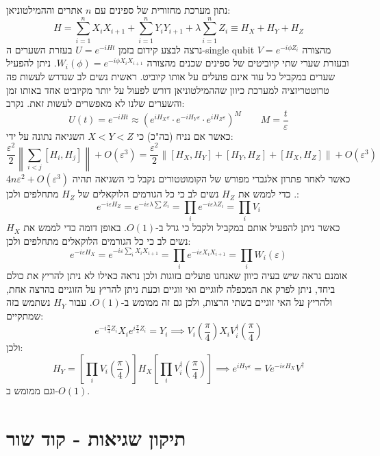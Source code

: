 \documentclass{tstextbook}
\begin{document}
\begin{example}
נתון מערכת מחזורית של ספינים עם \(n\) אתרים וההמילטוניאן:
$$H=\sum_{i=1}^{n}X_{i}X_{i+1}+\sum_{i=1}^{n}Y_{i}Y_{i+1}+\lambda\sum_{i=1}^{n}Z_{i}\equiv H_{X}+H_{Y}+H_{Z}$$
נרצה לבצע קידום בזמן \(U=e^{ -iHt }\) בעזרת השערים ה-single qubit מהצורה \(V=e^{ -i\phi Z_{i} }\) ובעזרת שערי שתי קיוביטים של ספינים שכנים מהצורה \(W_{i}\left( \phi \right)=e^{ -i\phi X_{i}X_{i+1} }\). ניתן להפעיל שערים במקביל כל עוד אינם פועלים על אותו קיוביט. ראשית נשים לב שנדרש לעשות פה טרוטטריזציה למערכת כיוון שההמילטוניאן דורש לפעול על יותר מקיוביט אחד באותו זמן והשערים שלנו לא מאפשרים לעשות זאת. נקרב:
$$U(t)=e^{ -iHt }\approx \left( e^{ iH_{X}\varepsilon }\cdot e^{ -iH_{Y} \varepsilon}\cdot e^{ iH_{Z}\varepsilon } \right)^{M}\qquad M=\frac{t}{\varepsilon}$$
כאשר אם נניח (בה"כ) כי \(X<Y<Z\) השגיאה נתונה על ידי:
$$\frac{\varepsilon^{2}}{2}\left\lVert  \sum_{i<j}[H_{i},H_{j}]  \right\rVert +O\left( \varepsilon^{3} \right)=\frac{\varepsilon^{2}}{2}\lVert [H_{X},H_{Y}]+[H_{Y},H_{Z}]+[H_{X},H_{Z}] \rVert +O\left( \varepsilon^{3} \right)$$
כאשר לאחר פתרון אלגברי מפורש של הקומוטטורים נקבל כי השגיאה תהיה \(4n\varepsilon^{2}+O\left( \varepsilon^{3} \right)\).
כדי לממש את \(H_{Z}\) נשים לב כי כל הגורמים הלוקאלים של \(H_{Z}\) מתחלפים ולכן:
$$e^{ -i\varepsilon H_{Z} }=e^{ -i\varepsilon \lambda \sum Z_{i} }=\prod_{i}e^{ -i\varepsilon \lambda Z_{i} }=\prod_{i}V_{i}$$
כאשר ניתן להפעיל אותם במקביל ולקבל כי גדל ב-\(O(1)\). באופן דומה כדי לממש את \(H_{X}\) נשים לב כי כל הגורמים הלוקאלים מתחלפים ולכן:
$$e^{ -i\varepsilon H_{X} }=e^{ -i\varepsilon \sum_{i}X_{i}X_{i+1}}=\prod_{i}e^{ -i\varepsilon X_{i}X_{i+1} }=\prod_{i} W_{i}\left( \varepsilon \right)$$
אומנם נראה שיש בעיה כיוון שאנחנו פועלים בזוגות ולכן נראה כאילו לא ניתן להריץ את כולם ביחד, ניתן לפרק את המכפלה לזוגיים ואי זוגיים וכעת ניתן להריץ על הזוגיים בהרצה אחת, ולהריץ על האי זוגיים בשתי הרצות, ולכן גם זה ממומש ב-\(O(1)\). עבור \(H_{Y}\) נשתמש בזה שמתקיים:
$$e^{ -i\frac{\pi}{4} Z_{i} }X_{i}e^{ i\frac{\pi}{4} Z_{i} }=Y_{i}\implies V_{i}\left( \frac{\pi}{4} \right)X_{i}V_{i}^{\dagger}\left( \frac{\pi}{4} \right)$$
ולכן:
$$H_{Y}=\left[ \prod_{i}V_{i}\left( \frac{\pi}{4} \right) \right]H_{X}\left[ \prod_{i}V_{i}^{\dagger}\left( \frac{\pi}{4} \right) \right]\implies e^{ iH_{Y}\varepsilon }=Ve^{ -i\varepsilon H_{X} }V^{\dagger}$$
וגם ממומש ב-\(O(1)\).

\end{example}
\section{תיקון שגיאות - קוד שור}
\end{document}

